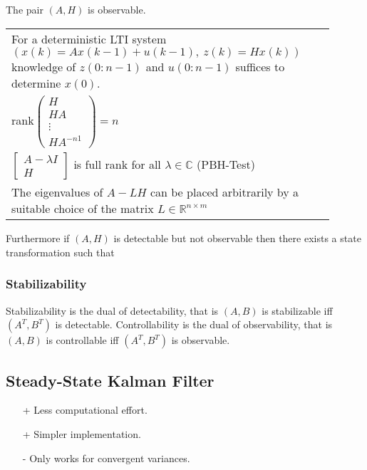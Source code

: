 \documentclass[10pt,a4paper]{scrartcl}
\begin{document}
\begin{multicols*}{2}
\vspace{3ex}

The pair $(A,H)$ is observable.

\begin{tabular}{@{$\Leftrightarrow\ $}p{0.9\linewidth}}
For a deterministic LTI system $(x(k)=Ax(k-1)+u(k-1),\ z(k)=Hx(k))$ knowledge of $z(0:n-1)$ and $u(0:n-1)$ suffices to determine $x(0)$.\\
rank$\begin{pmatrix}
H\\HA\\\vdots\\HA^{-n1}
\end{pmatrix}=n$\\
$\begin{bmatrix}
A-\lambda I\\H
\end{bmatrix}$ is full rank for all $\lambda\in\mathbb{C}$ (PBH-Test)\\
The eigenvalues of $A-LH$ can be placed arbitrarily by a suitable choice of the matrix $L\in\mathbb{R}^{n\times m}$
\end{tabular}

Furthermore if $(A,H)$ is detectable but not observable then there exists a state transformation such that 


\subsubsection{Stabilizability}

Stabilizability is the dual of detectability, that is $(A,B)$ is stabilizable iff $(A^T, B^T)$ is detectable. Controllability is the dual of observability, that is $(A,B)$ is controllable iff $(A^T,B^T)$ is observable.

\subsection{Steady-State Kalman Filter}

\begin{itemize}
\item[+] Less computational effort.
\item[+] Simpler implementation.
\item[-] Only works for convergent variances.
\end{itemize}


\end{multicols*}
\end{document}
